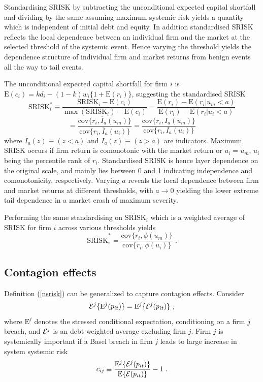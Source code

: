 \documentclass[authoryear]{elsarticle}
\newcommand{\E}{\mathrm{E}}
\newcommand{\cov}{\mathrm{cov}}
\newcommand{\Ex}{{\cal E}}
\newcommand{\eref}[1]{(\ref{#1})}
\newcommand{\be}[1]{\begin{equation}\label{#1}}
\newcommand{\ee}{\end{equation}}
\begin{document}
Standardising SRISK by subtracting the unconditional expected capital shortfall and dividing by the same assuming maximum systemic risk yields a quantity which is independent of initial debt and equity. In addition standardised SRISK reflects the local dependence between an individual firm and the market at the selected threshold of the systemic event. Hence varying the threshold yields the dependence structure of individual firm and market returns from benign events all the way to tail events.

The unconditional expected capital shortfall for firm $i$ is $\E(c_i)=kd_i-(1-k)w_i\{1+\E(r_i)\}$, suggesting the standardised SRISK
$$
\mathrm{SRISK}_i^* \equiv \frac{\mathrm{SRISK}_i-\E(c_i)}{\max(\mathrm{SRISK}_i)-\E(c_i)}
=\frac{\E(r_i)-\E(r_i|u_m<a)}{\E(r_i)-\E(r_i|u_i<a)}
$$
$$
=\frac{\cov\{r_i,\overline{I}_a(u_m)\}}{\cov\{r_i,\overline{I}_a(u_i)\}}
=\frac{\cov\{r_i,I_a(u_m)\}}{\cov\{r_i,I_a(u_i)\}} 
$$
where $\overline{I}_a(z)\equiv (z<a)$ and $I_a(z)\equiv (z>a)$ are indicators. Maximum SRISK occurs if firm return is comonotonic with the market return or $u_i=u_m$, $u_i$ being the percentile rank of $r_i$. Standardised SRISK is hence layer dependence on the original scale, and mainly lies between 0 and 1 indicating independence and comonotonicity, respectively. Varying $a$ reveals the local dependence between firm and market returns at different thresholds, with $a\rightarrow 0$ yielding the lower extreme tail dependence in a market crash of maximum severity.

Performing the same standardising on $\widetilde{\mathrm{SRISK}}_i$ which is a weighted average of SRISK for firm $i$ across various thresholds yields
$$
\widetilde{\mathrm{SRISK}}_i^* = \frac{\cov\{r_i,\phi(u_m)\}}{\cov\{r_i,\phi(u_i)\}}   \;.
$$




\subsection{Contagion effects}
Definition \eref{nsrisk} can be generalized to capture contagion effects.  Consider 
\be{cont}
\Ex^j\{\E^j(p_{it})\}=\E^j\{\Ex^j(p_{it})\}\ ,
\ee
where  $\E^j$ denotes the stressed conditional expectation, conditioning on a firm $j$ breach, and $\Ex^j$ is an debt weighted average excluding firm $j$.  Firm $j$ is systemically important  if a Basel breach in firm $j$ leads to large increase in system systemic risk
$$
c_{ij}\equiv \frac{\E^j\{\Ex^j(p_{it})\}}{\E\{\Ex(p_{it})\}}-1\ .
$$
\end{document}
